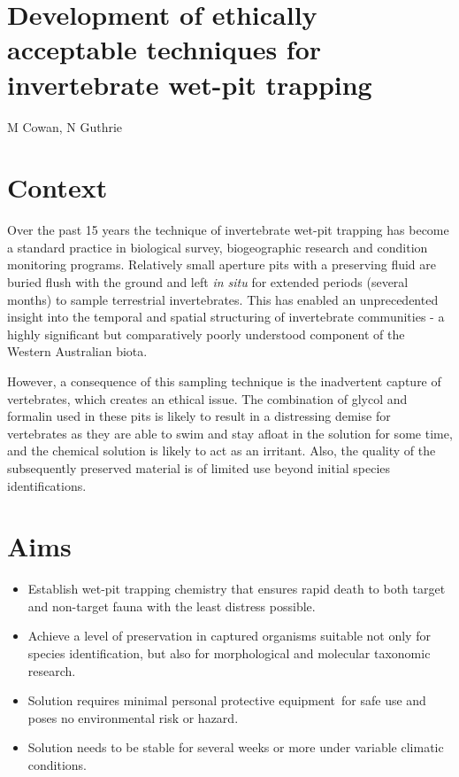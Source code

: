 \documentclass[version=last,
    paper=a4, %
    10pt, %
    usenames,
    dvipsnames,
    oneside, %
    headings=openany, %
    DIV=15 %
]{scrbook}
\begin{document}
\section*{Development of ethically acceptable techniques for invertebrate wet-pit
trapping
}

M Cowan, N Guthrie


\section*{Context}
Over the past 15 years the technique of invertebrate wet-pit trapping
has become a standard practice in biological survey, biogeographic
research and condition monitoring programs. Relatively small aperture
pits with a preserving fluid are buried flush with the ground and left
\emph{in situ} for extended periods (several months) to sample
terrestrial invertebrates. This has enabled an unprecedented insight
into the temporal and spatial structuring of invertebrate communities -
a highly significant but comparatively poorly understood component of
the Western Australian biota.

However, a consequence of this sampling technique is the inadvertent
capture of vertebrates, which creates an ethical issue. The combination
of glycol and formalin used in these pits is likely to result in a
distressing demise for vertebrates as they are able to swim and stay
afloat in the solution for some time, and the chemical solution is
likely to act as an irritant. Also, the quality of the subsequently
preserved material is of limited use beyond initial species
identifications.



\section*{Aims}
\begin{itemize}
\itemsep1pt\parskip0pt
\item
  Establish wet-pit trapping chemistry that ensures rapid death to both
  target and non-target fauna with the least distress possible.
\item
  Achieve a level of preservation in captured organisms suitable not
  only for species identification, but also for morphological and
  molecular taxonomic research.
\item
  Solution requires minimal personal protective equipment~for safe use
  and poses no environmental risk or hazard.
\item
  Solution needs to be stable for several weeks or more under variable
  climatic conditions.
\end{itemize}
\end{document}

